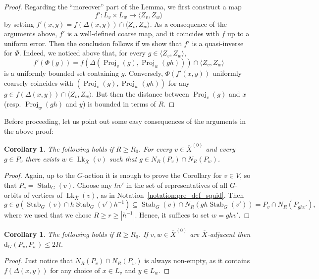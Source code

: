 \documentclass[svgnames]{amsart}
\theoremstyle{plain}
\newtheorem{cor}[thm]{Corollary}
\theoremstyle{definition}
\newcommand{\ov}[1]{\overline{#1}}
\newcommand{\dist}{\mathrm{d}}
\newcommand{\link}{\operatorname{Lk}}
\newcommand{\Stab}[2]{\operatorname{Stab}_{#1}(#2)}
\newcommand{\Proj}{\operatorname{Proj}}
\begin{document}
\begin{proof}
\par\medskip
    Regarding the “moreover” part of the Lemma, we first construct a map $$f'\colon L_v\times L_w\to \langle Z_v,Z_w\rangle$$ by setting $f'(x,y)= f(\Delta(x,y))\cap  \langle Z_v,Z_w\rangle$. As a consequence of the arguments above, $f'$ is a well-defined coarse map, and it coincides with $f$ up to a uniform error. Then the conclusion follows if we show that $f'$ is a quasi-inverse for $\Phi$. Indeed, we noticed above that, for every $g\in \langle Z_v, Z_w\rangle$, $$f'(\Phi(g))=f(\Delta(\Proj_v(g), \Proj_w(gh)))\cap \langle Z_v,Z_w\rangle$$ is a uniformly bounded set containing $g$. Conversely, $\Phi(f'(x,y))$ uniformly coarsely coincides with $(\Proj_v(g),\Proj_w(gh))$ for any $g\in f(\Delta(x,y))\cap \langle Z_v,Z_w\rangle$. But then the distance between $\Proj_v(g)$ and $x$ (resp. $\Proj_w(gh)$ and $y$) is bounded in terms of $R$.
\end{proof}


Before proceeding, let us point out some easy consequences of the arguments in the above proof:
\begin{cor}\label{cor:g_in_edge_prod_region} The following holds if $R\ge R_0$. For every $v\in \ov{X}^{(0)}$ and every $g\in P_v$ there exists $w\in \link_{\ov X}(v)$ such that $g\in N_R(P_v)\cap N_R(P_w)$. 
\end{cor}

\begin{proof}
    Again, up to the $G$-action it is enough to prove the Corollary for $v\in V$, so that $P_v=\Stab{G}{v}$. Choose any $hv'$ in the set of representatives of all $G$-orbits of vertices of $\link_{\ov X}(v)$, as in Notation~\ref{notation:pre_def_squid}. Then
    $$g\in g\left(\Stab{G}{v}\cap h\Stab{G}{v'}h^{-1}\right)\subseteq  \Stab{G}{v}\cap N_R\left(gh\Stab{G}{v'}\right)=P_v\cap N_R(P_{ghv'}),$$
    where we used that we chose $R\ge r\ge |h^{-1}|$.
    Hence, it suffices to set $w=gh v'$.
\end{proof}

\begin{cor}\label{cor:close_regions} The following holds if $R\ge R_0$. If $v,w\in\ov{X}^{(0)}$ are $\ov{X}$-adjacent then $\dist_G(P_v, P_w)\le 2R$. 
\end{cor}

\begin{proof}
Just notice that $N_R(P_v)\cap N_R(P_w)$ is always non-empty, as it contains $f(\Delta(x,y))$ for any choice of $x\in L_v$ and $y\in L_w$.
\end{proof}
\end{document}
